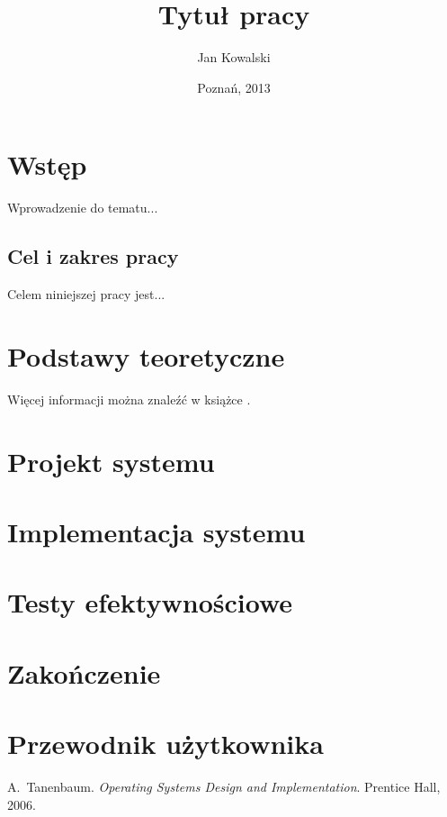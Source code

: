 \documentclass[11pt,a4paper,polish,thesis]{dcsbook}
\begin{document}
\author{Jan Kowalski}
\title{Tytuł pracy}
\date{Poznań, 2013}
\maketitle
\frontmatter
\tableofcontents{}
\mainmatter

\chapter{Wstęp}

Wprowadzenie do tematu...

\section*{Cel i zakres pracy}

Celem niniejszej pracy jest...

\chapter{Podstawy teoretyczne}

Więcej informacji można znaleźć w książce \cite{sop}.

\chapter{Projekt systemu}

\chapter{Implementacja systemu}

\chapter{Testy efektywnościowe}

\chapter{Zakończenie}

\appendix

\chapter{Przewodnik użytkownika}

\backmatter

\begin{thebibliography}{1}
A.~Tanenbaum. \emph{Operating Systems Design and Implementation}.
Prentice Hall, 2006.
\end{thebibliography}
\end{document}
